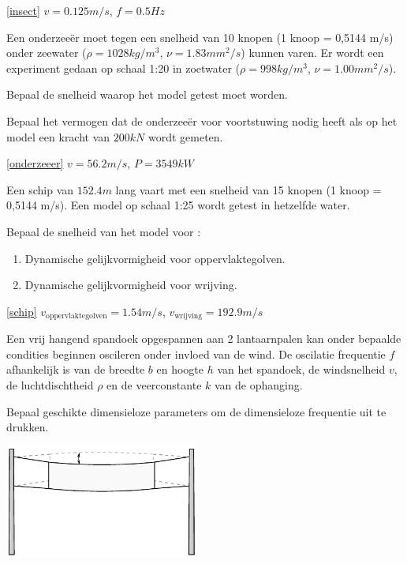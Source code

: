 \begin{antwoord}{\ref{insect}}
	$v = 0.125\unit{m/s}$, $f = 0.5\unit{Hz}$
\end{antwoord}
\begin{toepassing}[*]
	\label{onderzeeer}	
Een onderzeeër moet tegen een snelheid van 10 knopen (1 knoop = 0,5144 m/s) onder zeewater ($\rho = 1028\unit{kg/m^3}$, $\nu = 1.83\unit{mm^2/s}$) kunnen varen. Er wordt een experiment gedaan op schaal 1:20 in zoetwater ($\rho = 998\unit{kg/m^3}$, $\nu = 1.00\unit{mm^2/s}$).
		
Bepaal de snelheid waarop het model getest moet worden.
		
Bepaal het vermogen dat de onderzeeër voor voortstuwing nodig heeft als op het model een kracht van $200\unit{kN}$ wordt gemeten.
\end{toepassing}
\begin{antwoord}{\ref{onderzeeer}}
	$v = 56.2\unit{m/s}$, $P = 3549\unit{kW}$
\end{antwoord}
\begin{toepassing}[*]
	\label{schip}
Een schip van $152.4\unit{m}$ lang vaart met een snelheid van 15 knopen (1 knoop = 0,5144 m/s). Een model op schaal 1:25 wordt getest in hetzelfde water.

Bepaal de snelheid van het model voor :
	\begin{enumerate}
		\item Dynamische gelijkvormigheid voor oppervlaktegolven.
		\item Dynamische gelijkvormigheid voor wrijving.
	\end{enumerate}
\end{toepassing}
\begin{antwoord}{\ref{schip}}
	$v_{\text{oppervlaktegolven}} = 1.54\unit{m/s}$, $v_{\text{wrijving}} = 192.9\unit{m/s}$
\end{antwoord}
\begin{toepassing}
	\label{spandoek}
Een vrij hangend spandoek opgespannen aan 2 lantaarnpalen kan onder bepaalde condities beginnen oscileren onder invloed van de wind. De oscilatie frequentie $f$ afhankelijk is van de breedte $b$ en hoogte $h$ van het spandoek, de windsnelheid $v$, de luchtdischtheid $\rho$ en de veerconstante $k$ van de ophanging.

Bepaal geschikte dimensieloze parameters om de dimensieloze frequentie uit te drukken. 

	\centering
	\includegraphics[width=0.48\textwidth]{fig/gelijkvormigheid/spandoek.pdf}
\end{toepassing}
